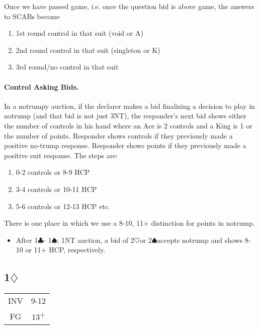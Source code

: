 \documentclass[10pt]{article}
\renewcommand{\c}{$\clubsuit$}
\renewcommand{\d}{$\diamondsuit$}
\newcommand{\h}{$\heartsuit$}
\newcommand{\s}{$\spadesuit$}
\newcommand{\p}{\textsuperscript{+}}
\newcommand{\pdfd}{\texorpdfstring{\d{}}{D}}
\begin{document}
\begin{multicols*}{2}
Once we have passed game, i.e. once the question bid is above game, the answers
to SCABs become
\begin{enumerate}
\item 1st round control in that suit (void or A)
\item 2nd round control in that suit (singleton or K)
\item 3rd round/no control in that suit
\end{enumerate}

\paragraph{Control Asking Bids.}

In a notrumpy auction, if the declarer makes a bid finalizing a decision to play
in notrump (and that bid is not just 3NT), the responder’s next bid shows either
the number of controls in his hand where an Ace is 2 controls and a King is 1 or
the number of points. Responder shows controls if they previously made a
positive no-trump response. Responder shows points if they previously made a
positive suit response. The steps are:
\begin{enumerate}
\item 0-2 controls or 8-9 HCP
\item 3-4 controls or 10-11 HCP
\item 5-6 controls or 12-13 HCP etc.
\end{enumerate}
There is one place in which we use a 8-10, 11+ distinction for points in notrump.
\begin{itemize}
\item After 1\c - 1\s; 1NT auction, a bid of 2\h or 2\s accepts notrump and shows
  8-10 or 11+ HCP, respectively.
\end{itemize}
\newpage

\subsection{1\pdfd}

\begin{tabular}{c|c}
INV & 9-12 \\
FG  & 13\p \\
\end{tabular}


\end{multicols*}
\end{document}
